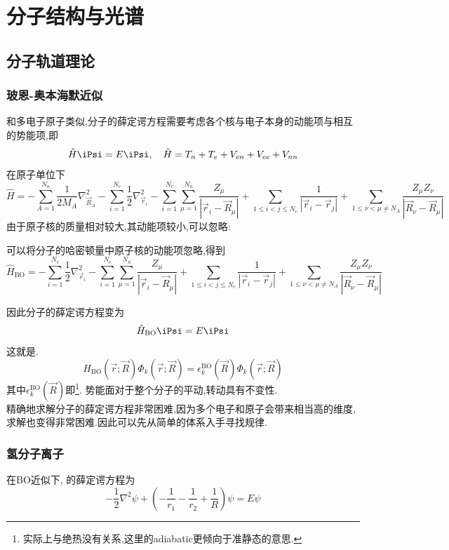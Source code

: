 \documentclass{ctexbook}
\begin{document}
\chapter{分子结构与光谱}
\section{分子轨道理论}
\subsection{玻恩-奥本海默近似}
和多电子原子类似,分子的薛定谔方程需要考虑各个核与电子本身的动能项与相互的势能项,即
\[\hat{H}\iPsi=E\iPsi,\quad\hat{H}=T_{n}+T_{e}+V_{en}+V_{ee}+V_{nn}\]
在原子单位下
\[\hat{H}=-\sum_{A=1}^{N_n}\dfrac{1}{2M_A}\nabla_{\vec{R}_A}^2-\sum_{i=1}^{N_e}\dfrac{1}{2}\nabla_{\vec{r}_i}^2-\sum_{i=1}^{N_e}\sum_{\mu=1}^{N_n}\dfrac{Z_\mu}{\left|\vec{r}_i-\vec{R}_{\mu}\right|}+\sum_{1\leq i<j\leq N_e}\dfrac{1}{\left|\vec{r}_i-\vec{r}_j\right|}+\sum_{1\leq\nu<\mu\neq N_A}\dfrac{Z_\mu Z_\nu}{\left|\vec{R}_\nu-\vec{R}_\mu\right|}\]
由于原子核的质量相对较大,其动能项较小,可以忽略:
\begin{theorem}[玻恩-奥本海默近似]
	可以将分子的哈密顿量中原子核的动能项忽略,得到
	\[\hat{H}_{\text{BO}}=-\sum_{i=1}^{N_e}\dfrac{1}{2}\nabla_{\vec{r}_i}^2-\sum_{i=1}^{N_e}\sum_{\mu=1}^{N_n}\dfrac{Z_\mu}{\left|\vec{r}_i-\vec{R}_{\mu}\right|}+\sum_{1\leq i<j\leq N_e}\dfrac{1}{\left|\vec{r}_i-\vec{r}_j\right|}+\sum_{1\leq\nu<\mu\neq N_A}\dfrac{Z_\mu Z_\nu}{\left|\vec{R}_\nu-\vec{R}_\mu\right|}\]
\end{theorem}
因此分子的薛定谔方程变为
\[\hat{H}_{\text{BO}}\iPsi=E\iPsi\]
这就是.
\[\hat{H}_{\text{BO}}(\vec{r};\vec{R})\Phi_k(\vec{r};\vec{R})=\epsilon_k^{\text{BO}}(\vec{R})\Phi_k(\vec{r};\vec{R})\]
其中$\epsilon_k^{\text{BO}}(\vec{R})$即\footnote{实际上与绝热没有关系,这里的adiabatic更倾向于准静态的意思.}. 势能面对于整个分子的平动,转动具有不变性.\\
\indent 精确地求解分子的薛定谔方程非常困难,因为多个电子和原子会带来相当高的维度,求解也变得非常困难.因此可以先从简单的体系入手寻找规律.
\subsection{氢分子离子}
在BO近似下, 的薛定谔方程为
\[-\dfrac12\nabla^2\psi+\left(-\dfrac{1}{r_1}-\dfrac{1}{r_2}+\dfrac{1}{R}\right)\psi=E\psi\]
\end{document}
